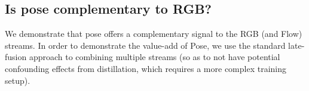 \documentclass[letterpaper]{article} \usepackage{aaai21}  \usepackage{times}  \usepackage{helvet} \usepackage{courier}  \usepackage[hyphens]{url}  \usepackage{graphicx} \urlstyle{rm} \def\UrlFont{\rm}  \usepackage{natbib}  \usepackage{caption} \frenchspacing  \setlength{\pdfpagewidth}{8.5in}  \setlength{\pdfpageheight}{11in}
\begin{document}
\begin{table}[!htb] 
    \centering
    \caption{\footnotesize Pose stream results using Resnet50-G on Kinetics-600 dataset with markers: dot or bar, and ratio-aware marker size. The pose model is trained to validate performance. We also evaluate the approach of rendering on a black background, but since many training frames have no detected pose the performance of this na{\"i}ve approach tends to be very low.}
\label{tbl:rendering}
\vspace{-0.2cm}
\end{table}



\subsection{Is pose complementary to RGB?}


We demonstrate that pose offers a complementary signal to the RGB (and Flow) streams. In order to demonstrate the value-add of Pose, we use
the standard late-fusion approach to combining multiple streams (so as to not have potential confounding effects from distillation, which requires a more
complex training setup).
\end{document}
